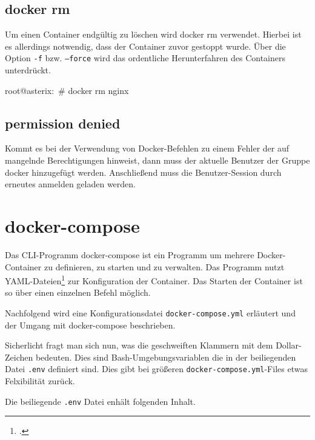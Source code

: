 \subsection{docker rm}%
\label{sec:docker-befehle.rm}
Um einen Container endgültig zu löschen wird docker rm verwendet. Hierbei ist es allerdings notwendig, dass der Container zuvor gestoppt wurde. Über die Option \texttt{-f} bzw. \texttt{--force} wird das ordentliche Herunterfahren des Containers unterdrückt.

\begin{bashcode}
  root@asterix:~# docker rm nginx
\end{bashcode}

\subsection{permission denied}%
\label{sec:docker-befehle.permission_denied}
Kommt es bei der Verwendung von Docker-Befehlen zu einem Fehler der auf mangelnde Berechtigungen hinweist, dann muss der aktuelle Benutzer der Gruppe docker hinzugefügt werden. Anschließend muss die Benutzer-Session durch erneutes anmelden geladen werden.



\section{docker-compose}%
\label{sec:docker-compose}
Das CLI-Programm docker-compose ist ein Programm um mehrere Docker-Container zu definieren, zu starten und zu verwalten. Das Programm nutzt YAML-Dateien\footcite{yaml} zur Konfiguration der Container. Das Starten der Container ist so über einen einzelnen Befehl möglich.

Nachfolgend wird eine Konfigurationsdatei \texttt{docker-compose.yml} erläutert und der Umgang mit docker-compose beschrieben.

\begin{landscape}
\end{landscape}

Sicherlicht fragt man sich nun, was die geschweiften Klammern mit dem Dollar-Zeichen bedeuten. Dies sind Bash-Umgebungsvariablen die in der beiliegenden Datei \texttt{.env} definiert sind. Dies gibt bei größeren \texttt{docker-compose.yml}-Files etwas Felxibilität zurück.

Die beiliegende \texttt{.env} Datei enhält folgenden Inhalt.


